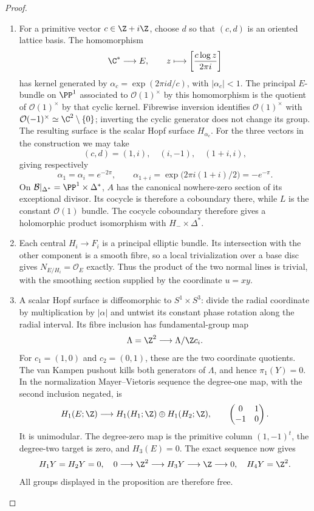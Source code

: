\begin{proof}
\begin{enumerate}[label=\arabic*.,leftmargin=*]
\item For a primitive vector
$c\in\Z+i\Z$, choose $d$ so that $(c,d)$ is an oriented
lattice basis.  The homomorphism
\[
 \C^*\longrightarrow E,\qquad
 z\longmapsto\left[\frac{c\log z}{2\pi i}\right]
\]
has kernel generated by
$\alpha_c=\exp(2\pi i d/c)$, with $|\alpha_c|<1$.
The principal $E$-bundle on $\PP^1$ associated to
$\mathcal O(1)^\times$ by this homomorphism is the quotient
of $\mathcal O(1)^\times$ by that cyclic kernel.  Fibrewise
inversion identifies $\mathcal O(1)^\times$ with
$\mathcal O(-1)^\times\simeq\C^2\setminus\{0\}$;
inverting the cyclic generator does not change its group.
The resulting surface is the scalar Hopf surface $H_{\alpha_c}$.
For the three vectors in the construction we may take
\[
 (c,d)=(1,i),\quad(i,-1),\quad(1+i,i),
\]
giving respectively
\[
 \alpha_1=\alpha_i=e^{-2\pi},\qquad
 \alpha_{1+i}=\exp\bigl(2\pi i(1+i)/2\bigr)=-e^{-\pi}.
\]
On $\mathcal B|_{\Delta^*}=\PP^1\times\Delta^*$,
$A$ has the canonical nowhere-zero section of its exceptional
divisor.  Its cocycle is therefore a coboundary there, while
$L$ is the constant $\mathcal O(1)$ bundle.  The cocycle coboundary therefore gives a holomorphic product
isomorphism with $H_-\times\Delta^*$.

\item Each central $H_i\to F_i$ is a principal elliptic bundle.
Its intersection with the other component is a smooth fibre,
so a local trivialization over a base disc gives
$N_{E/H_i}=\mathcal O_E$ exactly.  Thus the product of the
two normal lines is trivial, with the smoothing section supplied
by the coordinate $u=xy$.

\item A scalar Hopf surface is
diffeomorphic to $S^1\times S^3$: divide the radial coordinate
by multiplication by $|\alpha|$ and untwist its constant phase
rotation along the radial interval.  Its fibre inclusion has
fundamental-group map
\[
 \Lambda=\Z^2\longrightarrow\Lambda/\Z c_i.
\]
For $c_1=(1,0)$ and $c_2=(0,1)$, these are the two coordinate
quotients.  The van Kampen pushout kills both generators of
$\Lambda$, and hence $\pi_1(Y)=0$.  In the normalization
Mayer--Vietoris sequence the degree-one map, with the second
inclusion negated, is
\[
 H_1(E;\Z)\longrightarrow H_1(H_1;\Z)\oplus H_1(H_2;\Z),
 \qquad \begin{pmatrix}0&1\\-1&0\end{pmatrix}.
\]
It is unimodular.  The degree-zero map is the primitive column
$(1,-1)^t$, the degree-two target is zero, and $H_3(E)=0$.
The exact sequence now gives
\[
 H_1Y=H_2Y=0,\quad
 0\longrightarrow\Z^2\longrightarrow H_3Y
       \longrightarrow\Z\longrightarrow0,
 \quad H_4Y=\Z^2.
\]
All groups displayed in the proposition are therefore free.


\end{enumerate}
\end{proof}
